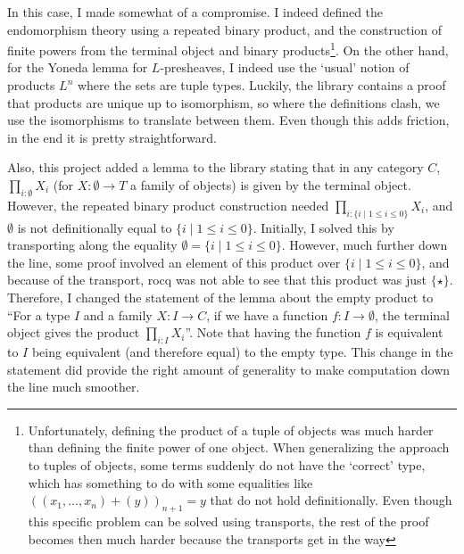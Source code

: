 In this case, I made somewhat of a compromise. I indeed defined the endomorphism theory using a repeated binary product, and the construction of finite powers from the terminal object and binary products\footnote{Unfortunately, defining the product of a tuple of objects was much harder than defining the finite power of one object. When generalizing the approach to tuples of objects, some terms suddenly do not have the `correct' type, which has something to do with some equalities like $ ((x_1, \dots, x_n) + (y))_{n + 1} = y $ that do not hold definitionally. Even though this specific problem can be solved using transports, the rest of the proof becomes then much harder because the transports get in the way}. On the other hand, for the Yoneda lemma for $ L $-presheaves, I indeed use the `usual' notion of products $ L^n $ where the sets are tuple types. Luckily, the library contains a proof that products are unique up to isomorphism, so where the definitions clash, we use the isomorphisms to translate between them. Even though this adds friction, in the end it is pretty straightforward.

Also, this project added a lemma to the library stating that in any category $ C $, $ \prod_{i : \emptyset} X_i $ (for $ X : \emptyset \to T $ a family of objects) is given by the terminal object. However, the repeated binary product construction needed $ \prod_{i : \{ i \mid 1 \leq i \leq 0 \}} X_i $, and $ \emptyset $ is not definitionally equal to $ \{ i \mid 1 \leq i \leq 0 \} $. Initially, I solved this by transporting along the equality $ \emptyset = \{ i \mid 1 \leq i \leq 0 \} $. However, much further down the line, some proof involved an element of this product over $ \{ i \mid 1 \leq i \leq 0 \} $, and because of the transport, rocq was not able to see that this product was just $ \{ \star \} $. Therefore, I changed the statement of the lemma about the empty product to ``For a type $ I $ and a family $ X : I \to C $, if we have a function $ f : I \to \emptyset $, the terminal object gives the product $ \prod_{i : I} X_i $''. Note that having the function $ f $ is equivalent to $ I $ being equivalent (and therefore equal) to the empty type. This change in the statement did provide the right amount of generality to make computation down the line much smoother.

